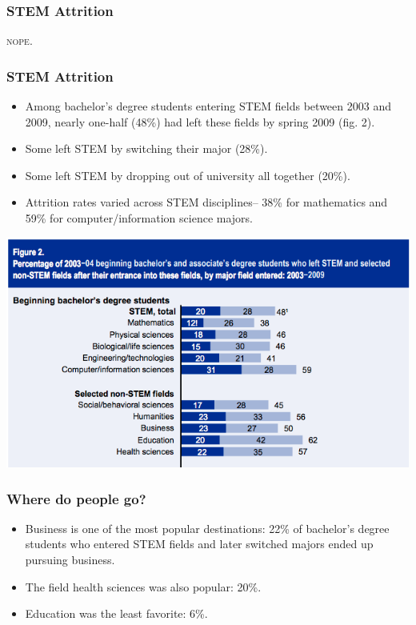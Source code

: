 \documentclass{beamer}
\begin{document}
\begin{frame}
  \frametitle{STEM Attrition}
  \centering
  \textsc{nope}.
\end{frame}

\begin{frame}
  \frametitle{STEM Attrition}
  \begin{itemize}
  \item Among bachelor's degree students entering STEM fields between 2003 and 2009, nearly one-half (48\%) had left these fields by spring 2009 (fig. 2).
  \item Some left STEM by switching their major (28\%).
  \item Some left STEM by dropping out of university all together (20\%).
  \item Attrition rates varied across STEM disciplines-- 38\% for mathematics and 59\% for computer/information science majors.
  \end{itemize} 
\end{frame}

\begin{frame}
  \centering
  \includegraphics[scale = 0.5]{pic2.png}
\end{frame}

\begin{frame}
  \frametitle{Where do people go?}
  \begin{itemize}
  \item Business is one of the most popular destinations: 22\% of bachelor's degree students who entered STEM fields and later switched majors ended up pursuing business.
  \item The field health sciences was also popular: 20\%.
  \item Education was the least favorite: 6\%.
  \end{itemize}
\end{frame}
\end{document}
